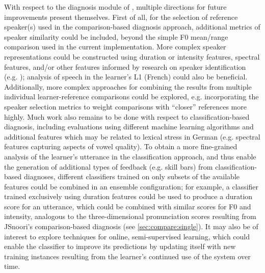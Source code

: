 	

	
	
	
	
	With respect to the diagnosis module of , multiple directions for future improvements present themselves. 
	First of all, for the selection of reference speaker(s) used in the comparison-based diagnosis approach, additional metrics of speaker similarity could be included, beyond the simple F0 mean/range comparison used in the current implementation. More complex speaker representations could be constructed using duration or intensity features, spectral features, and/or other features informed by research on speaker identification (e.g. \cite{Shriberg2005}); analysis of speech in the learner's L1 (French) could also be beneficial. Additionally, more complex approaches for combining the results from multiple individual learner-reference comparisons could be explored, e.g. incorporating the speaker selection metrics to weight comparisons with ``closer'' references more highly. 
	Much work also remains to be done with respect to classification-based diagnosis, including evaluations using different machine learning algorithms and additional features which may be related to lexical stress in German (e.g. spectral features capturing aspects of vowel quality). To obtain a more fine-grained analysis of the learner's utterance in the classification approach, and thus enable the generation of additional types of feedback (e.g. skill bars) from classification-based diagnoses, different classifiers trained on only subsets of the available features could be combined in an ensemble configuration; for example, a classifier trained exclusively using duration features could be used to produce a duration score for an utterance, which could be combined with similar scores for F0 and intensity, analogous to the three-dimensional pronunciation scores resulting from JSnoori's comparison-based diagnosis (see \cref{sec:compare:single}). It may also be of interest to explore techniques for online, semi-supervised learning, which could enable the classifier to improve its predictions by updating itself with new training instances resulting from the learner's continued use of the system over time.
	
